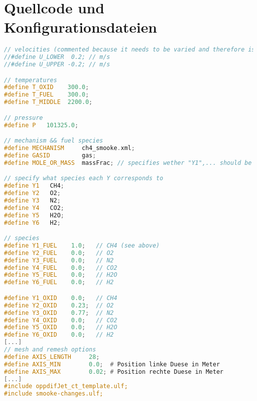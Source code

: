 \section{Quellcode und Konfigurationsdateien}
\label{sct:listings}

\begin{lstlisting}[language=C++,label=lst:ch4smooke.ulf,caption={Auszug aus \lstinline!oppdifJet_ct_CH4_Air_smooke.ulf!}]
// velocities (commented because it needs to be varied and therefore is included in an extra file smooke-changes.ulf (see bottom)
//#define U_LOWER  0.2; // m/s
//#define U_UPPER -0.2; // m/s

// temperatures
#define T_OXID    300.0;
#define T_FUEL    300.0;
#define T_MIDDLE  2200.0;

// pressure
#define P   101325.0;

// mechanism && fuel species
#define MECHANISM     ch4_smooke.xml;
#define GASID         gas;
#define MOLE_OR_MASS  massFrac; // specifies wether "Y1",... should be interpreted as the mass fraction or mole fraction

// specify what species each Y corresponds to
#define Y1   CH4;
#define Y2   O2;
#define Y3   N2;
#define Y4   CO2;
#define Y5   H2O;
#define Y6   H2;

// species
#define Y1_FUEL    1.0;   // CH4 (see above)
#define Y2_FUEL    0.0;   // O2
#define Y3_FUEL    0.0;   // N2
#define Y4_FUEL    0.0;   // CO2
#define Y5_FUEL    0.0;   // H2O
#define Y6_FUEL    0.0;   // H2

#define Y1_OXID    0.0;   // CH4
#define Y2_OXID    0.23;  // O2
#define Y3_OXID    0.77;  // N2
#define Y4_OXID    0.0;   // CO2
#define Y5_OXID    0.0;   // H2O
#define Y6_OXID    0.0;   // H2
[...]
// mesh and remesh options
#define AXIS_LENGTH     28;
#define AXIS_MIN        0.0;  # Position linke Duese in Meter
#define AXIS_MAX        0.02; # Position rechte Duese in Meter
[...]
#include oppdifJet_ct_template.ulf;
#include smooke-changes.ulf;
\end{lstlisting}


